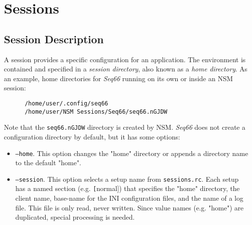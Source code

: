 %
%
%

\section{Sessions}
\label{sec:sessions}

\subsection{Session Description}
\label{subsec:session_description}

   A session provides a specific configuration for an application.
   The environment is contained and specified in a
   \textsl{session directory}, also known as a
   \textsl{home directory}.
   As an example, home directories for \textsl{Seq66} running on its
   own or inside an NSM session:

   \begin{verbatim}
      /home/user/.config/seq66
      /home/user/NSM Sessions/Seq66/seq66.nGJDW
   \end{verbatim}

   Note that the \texttt{seq66.nGJDW} directory is created by NSM.
   \textsl{Seq66} does not create a configuration directory by default, 
   but it has some options:

   \begin{itemize}
      \item \texttt{--home}.
         This option changes the "home" directory or appends a directory name
         to the default "home".
      \item \texttt{--session}.
         This option selects a setup name from \texttt{sessions.rc}.
         Each setup has a named section (e.g. \texttt[normal]) that specifies
         the "home" directory, the client name, base-name for the
         INI configuration files, and the name of a log file.
         This file is only read, never written.
         Since value names (e.g. "home") are duplicated, special processing
         is needed.
   \end{itemize}

